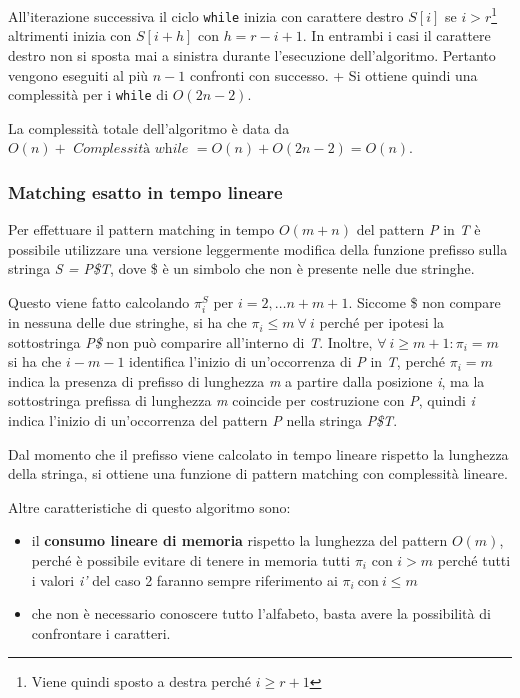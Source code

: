 All'iterazione successiva il ciclo \texttt{while} inizia con carattere destro $S[i]$ se $i > r$\footnote{Viene quindi sposto a destra perché $ i \geq r+1 $} altrimenti inizia con $S[i + h]$ con $h = r - i + 1$. In entrambi i casi il carattere destro non si sposta mai a sinistra durante l'esecuzione dell'algoritmo. 
Pertanto vengono eseguiti al più $n-1$ confronti con successo. +
Si ottiene quindi una complessità per i \texttt{while} di $O(2n-2)$.

La complessità totale dell'algoritmo è data da $O(n) +\textit{ Complessità while }= O(n) + O(2n-2) = O(n)$.

\subsubsection{Matching esatto in tempo lineare}\label{matching-esatto-in-tempo-lineare}

Per effettuare il pattern matching in tempo $O(m+n)$ del pattern \emph{P} in \emph{T} è possibile utilizzare una versione leggermente modifica della funzione prefisso sulla stringa \emph{S = P\$T}, dove \$ è un simbolo che non è presente nelle due stringhe.

Questo viene fatto calcolando $ \pi_i^S $ per $ i = 2, \ldots n + m +1 $.
Siccome \$ non compare in nessuna delle due stringhe, si ha che $ \pi_i \leq m \: \forall \: i $ perché per ipotesi la sottostringa \textit{P\$} non può comparire all'interno di \textit{T}.
Inoltre, $ \forall \: i \geq m +1 : \pi_i = m $ si ha che $i - m - 1$ identifica l'inizio di un'occorrenza di \textit{P} in \textit{T}, perché $ \pi_i = m $ indica la presenza di prefisso di lunghezza \textit{m} a partire dalla posizione \textit{i}, ma la sottostringa prefissa di lunghezza \textit{m} coincide per costruzione con \textit{P}, quindi \textit{i} indica l'inizio di un'occorrenza del pattern \textit{P} nella stringa \textit{P\$T}.

Dal momento che il prefisso viene calcolato in tempo lineare rispetto la lunghezza della stringa, si ottiene una funzione di pattern matching con complessità lineare.

Altre caratteristiche di questo algoritmo sono:
\begin{itemize}
	\item il \textbf{consumo lineare di memoria} rispetto la lunghezza del pattern $ O(m) $, perché è possibile evitare di tenere in memoria tutti $ \pi_i $ con $ i >m $ perché tutti i valori \textit{i'} del caso 2 faranno sempre riferimento ai $ \pi_i \: \text{con}\: i \leq m $
	\item che non è necessario conoscere tutto l'alfabeto, basta avere la possibilità di confrontare i caratteri.
\end{itemize}


